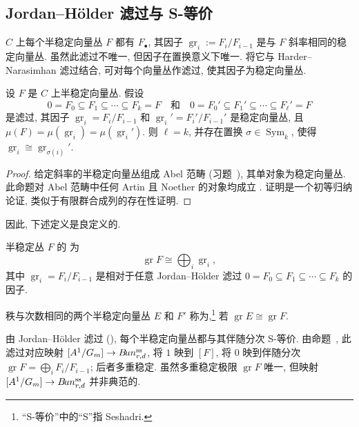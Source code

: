 \subsection{Jordan--H\"older 滤过与 S-等价}\label{src:9.1.4-subsection}
$C$ 上每个半稳定向量丛 $F$ 都有 $F_\bullet$, 其因子 $\operatorname{gr}_i:=F_i/F_{i-1}$ 是与 $F$ 斜率相同的稳定向量丛. 虽然此滤过不唯一, 但因子在置换意义下唯一. 将它与 Harder--Narasimhan 滤过结合, 可对每个向量丛作滤过, 使其因子为稳定向量丛.
\begin{proposition}\label{src:9.1.32}
设 $F$ 是 $C$ 上半稳定向量丛. 假设
\[
0=F_0\subseteq F_1\subseteq\cdots\subseteq F_k=F
\quad\text{和}\quad
0=F_0'\subseteq F_1'\subseteq\cdots\subseteq F_\ell'=F
\]
是滤过, 其因子 $\operatorname{gr}_i=F_i/F_{i-1}$ 和 $\operatorname{gr}_i'=F_i'/F_{i-1}'$ 是稳定向量丛, 且 $\mu(F)=\mu(\operatorname{gr}_i)=\mu(\operatorname{gr}_i')$. 则 $\ell=k$, 并存在置换 $\sigma\in\operatorname{Sym}_k$, 使得 $\operatorname{gr}_i\cong\operatorname{gr}_{\sigma(i)}'$.
\end{proposition}
\begin{proof}
给定斜率的半稳定向量丛组成 Abel 范畴 (习题~), 其单对象为稳定向量丛. 此命题对 Abel 范畴中任何 Artin 且 Noether 的对象均成立 \cite[Tag 0FCK]{SP}. 证明是一个初等归纳论证, 类似于有限群合成列的存在性证明.
\end{proof}
因此, 下述定义是良定义的.
\begin{definition}[伴随分次]\label{src:9.1.33}
半稳定丛 $F$ 的 为
\[
\operatorname{gr}F\cong\bigoplus_i\operatorname{gr}_i,
\]
其中 $\operatorname{gr}_i=F_i/F_{i-1}$ 是相对于任意 Jordan--H\"older 滤过 $0=F_0\subseteq F_1\subseteq\cdots\subseteq F_k$ 的因子.
\end{definition}
\begin{definition}[S-等价]\label{src:9.1.34}
秩与次数相同的两个半稳定向量丛 $E$ 和 $F'$ 称为,\footnote{``S-等价''中的``S''指 Seshadri.} 若 $\operatorname{gr}E\cong\operatorname{gr}F$.
\end{definition}
由 Jordan--H\"older 滤过 (), 每个半稳定向量丛都与其伴随分次 S-等价. 由命题~, 此滤过对应映射 $[A^1/G_m]\to B\!un_{r,d}^{\mathrm{ss}}$, 将 $1$ 映到 $[F]$, 将 $0$ 映到伴随分次 $\operatorname{gr}F=\bigoplus_iF_i/F_{i-1}$; 后者多重稳定. 虽然多重稳定极限 $\operatorname{gr}F$ 唯一, 但映射 $[A^1/G_m]\to B\!un_{r,d}^{\mathrm{ss}}$ 并非典范的.

